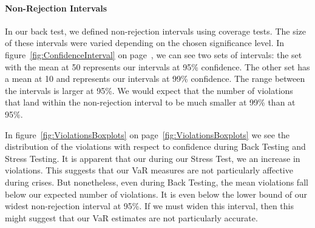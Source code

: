 \documentclass[../Dissertation.tex]{subfiles}
\begin{document}
\paragraph{Non-Rejection Intervals}	
In our back test, we defined non-rejection intervals using coverage tests.
The size of these intervals were varied depending on the chosen significance level.		
In figure~\ref{fig:ConfidenceInterval} on page~\pageref{fig:ConfidenceInterval}, we can see two sets of intervals: the set with the mean at 50 represents our intervals at  95\% confidence.
The other set has a mean at 10 and represents our intervals at 99\% confidence.
The range between the intervals is larger at 95\%.
We would expect that the number of violations that land within the non-rejection interval to be much smaller at 99\% than at 95\%.

In figure~\ref{fig:ViolationsBoxplots} on page~\ref{fig:ViolationsBoxplots} we see the distribution of the violations with respect to confidence during Back Testing and Stress Testing.
It is apparent that our during our Stress Test, we an increase in violations.
This suggests that our VaR measures are not particularly affective during crises.
But nonetheless, even during Back Testing, the mean violations fall below our expected number of violations.
It is even below the lower bound of our widest non-rejection interval at 95\%.
If we must widen this interval, then this might suggest that our VaR estimates are not particularly accurate.
\end{document}
